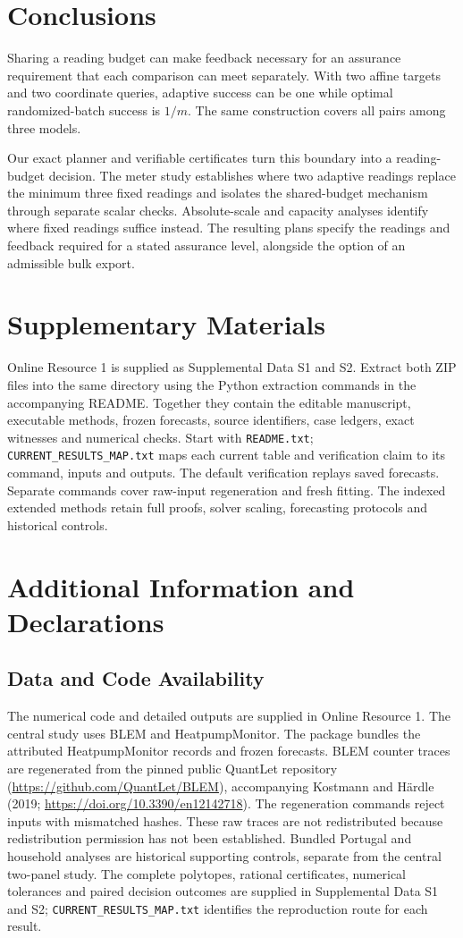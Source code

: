 \documentclass[12pt]{article}
\begin{document}
\section{Conclusions}
Sharing a reading budget can make feedback necessary for an assurance
requirement that each comparison can meet separately. With two affine
targets and two coordinate queries, adaptive success can be one while
optimal randomized-batch success is $1/m$. The same construction covers
all pairs among three models.

Our exact planner and verifiable certificates turn this boundary into a
reading-budget decision. The meter study establishes where two adaptive
readings replace the minimum three fixed readings and isolates the
shared-budget mechanism through separate scalar checks. Absolute-scale
and capacity analyses identify where fixed readings suffice instead.
The resulting plans specify the readings and feedback required for a stated
assurance level, alongside the option of an admissible bulk export.
\section*{Supplementary Materials}
Online Resource 1 is supplied as Supplemental Data S1 and S2. Extract both
ZIP files into the same directory using the Python extraction commands in
the accompanying README. Together they contain the editable manuscript,
executable methods, frozen forecasts, source identifiers, case ledgers,
exact witnesses and numerical checks. Start with \texttt{README.txt};
\texttt{CURRENT\_RESULTS\_MAP.txt} maps each current table and verification
claim to its command, inputs and outputs. The default verification replays
saved forecasts. Separate commands cover raw-input regeneration and fresh
fitting. The indexed extended methods retain full proofs, solver scaling,
forecasting protocols and historical controls.

\section*{Additional Information and Declarations}
\subsection*{Data and Code Availability}
The numerical code and detailed outputs are supplied in Online Resource 1.
The central study uses BLEM and HeatpumpMonitor. The package bundles the
attributed HeatpumpMonitor records and frozen forecasts. BLEM counter traces
are regenerated from the pinned public QuantLet repository
(\url{https://github.com/QuantLet/BLEM}), accompanying Kostmann and H\"ardle
(2019; \url{https://doi.org/10.3390/en12142718}). The regeneration commands
reject inputs with mismatched hashes. These raw traces are not redistributed
because redistribution permission has not been established. Bundled Portugal
and household analyses are historical supporting controls, separate from the
central two-panel study. The complete polytopes, rational certificates,
numerical tolerances and paired decision outcomes are supplied in Supplemental
Data S1 and S2; \texttt{CURRENT\_RESULTS\_MAP.txt} identifies the reproduction
route for each result.
\end{document}
